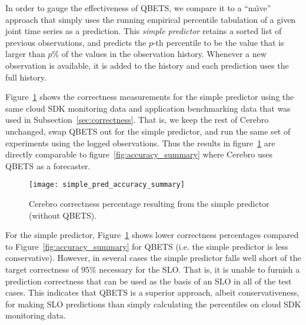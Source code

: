 In order to gauge the effectiveness of QBETS, we compare it to a ``na\"{\i}ve''
approach that simply uses the running empirical percentile tabulation
of a given joint time series as a prediction.
This \textit{simple predictor} retains a sorted list of previous observations,
and
predicts the $p$-th percentile to be the value that is larger than $p\%$ of
the values in the observation history.  Whenever a new observation is
available, it is added to the history and each prediction uses the full
history.  

Figure~\ref{fig:simple_pred_accuracy} shows the correctness measurements for
the simple predictor using the same cloud SDK monitoring data and application
benchmarking data that was used in Subsection~\ref{sec:correctness}. 
That is, we keep the rest of Cerebro unchanged, swap QBETS out for the simple
predictor, and run the same set of experiments using the logged observations. 
Thus the results in 
figure~\ref{fig:simple_pred_accuracy} are directly comparable to
figure~\ref{fig:accuracy_summary} where Cerebro uses QBETS as a forecaster.  

\begin{figure}
\centering
\texttt{[image: simple\_pred\_accuracy\_summary]}
\caption{Cerebro correctness percentage resulting from the simple predictor (without QBETS).}
\label{fig:simple_pred_accuracy}
\end{figure}

For the simple predictor, Figure~\ref{fig:simple_pred_accuracy} shows lower 
correctness percentages compared to Figure~\ref{fig:accuracy_summary} for
QBETS (i.e. the simple predictor is less conservative).
However, in several cases the simple predictor falls well short of the target 
correctness of $95\%$ necessary for the SLO.  That is, it is unable to furnish
a prediction correctness that can be used as the basis of an
SLO in all of the test cases.
This indicates that QBETS is a superior approach, albeit conservativeness,
for making SLO predictions than simply
calculating the percentiles on cloud SDK monitoring data.

